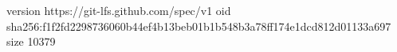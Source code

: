 version https://git-lfs.github.com/spec/v1
oid sha256:f1f2fd2298736060b44ef4b13beb01b1b548b3a78ff174e1dcd812d01133a697
size 10379
